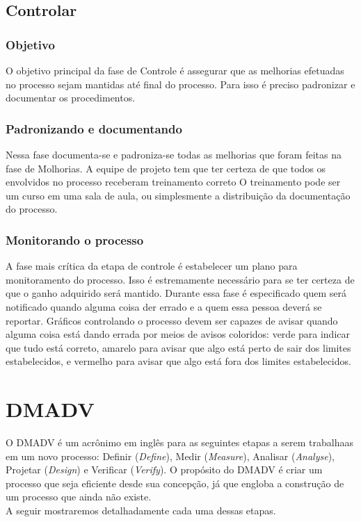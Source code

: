 \documentclass{abnt}
\begin{document}
				\subsection {Controlar}
					\subsubsection {Objetivo}
					O objetivo principal da fase de Controle é assegurar que as melhorias efetuadas no processo sejam 
					mantidas até final do processo. Para isso é preciso padronizar e documentar os procedimentos.
					\subsubsection {Padronizando e documentando}
					Nessa fase documenta-se e padroniza-se todas as melhorias que foram feitas na fase de Molhorias.
					A equipe de projeto tem que ter certeza de que todos os envolvidos no processo receberam treinamento correto 
					O treinamento pode ser um curso em uma sala de aula, ou simplesmente a distribuição da documentação do processo.
					\subsubsection {Monitorando o processo}
					A fase mais crítica da etapa de controle é estabelecer um plano para monitoramento do processo. Isso é estremamente 
					necessário para se ter certeza de que o ganho adquirido será mantido. Durante essa fase é especificado quem será 
					notificado quando alguma coisa der errado e a quem essa pessoa deverá se reportar.
					Gráficos controlando o processo devem ser capazes de avisar quando alguma coisa está dando errada por meios de 
					avisos coloridos: verde para indicar que tudo está correto, amarelo para avisar que algo está perto de sair dos limites estabelecidos, 
					e vermelho para avisar que algo está fora dos limites estabelecidos.
			\section {DMADV}
				O DMADV é um acrônimo em inglês para as seguintes etapas a serem trabalhaas em um 
				novo processo: Definir (\textit{Define}), Medir (\textit{Measure}), 
				Analisar (\textit{Analyse}), Projetar (\textit{Design}) e Verificar (\textit{Verify}).
				O propósito do DMADV é criar um processo que seja eficiente desde sua concepção, já que engloba a 
				construção de um processo que ainda não existe.
				\\
				A seguir mostraremos detalhadamente cada uma dessas etapas.
\end{document}
